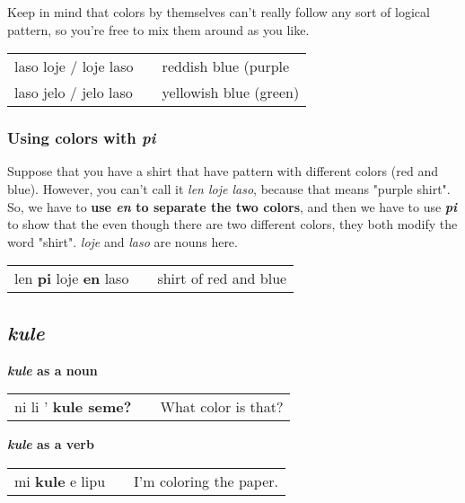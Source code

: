 Keep in mind that colors by themselves can't really follow any sort of logical pattern, so you're free to mix them around as you like. 

\begin{supertabular}{p{5,5cm}|ll}
laso loje / loje laso && reddish blue (purple \\
laso jelo / jelo laso && yellowish blue (green) \\
\end{supertabular} 
%
%
\subsubsection*{Using colors with \textit{pi}}
%
Suppose that you have a shirt that have pattern with different colors (red and blue). 
However, you can't call it \textit{len loje laso}, because that means "purple shirt". 
So, we have to \textbf{use \textit{en} to separate the two colors}, and then we have to use \textbf{\textit{pi}} to show that the even though there are two different colors, they both modify the word "shirt".
\textit{loje} and \textit{laso} are nouns here. 

\begin{supertabular}{p{5,5cm}|ll}
len \textbf{pi} loje \textbf{en} laso && shirt of red and blue \\
\end{supertabular} 
%
\subsection*{\textit{kule}}
%
\textbf{\textit{kule} as a noun} \\
\begin{supertabular}{p{5,5cm}|ll}
ni li ' \textbf{kule seme?} && What color is that? \\
\end{supertabular} 

\textbf{\textit{kule} as a verb} \\
\begin{supertabular}{p{5,5cm}|ll}
mi \textbf{kule} e lipu && I'm coloring the paper. \\
\end{supertabular} 
%
\newpage
